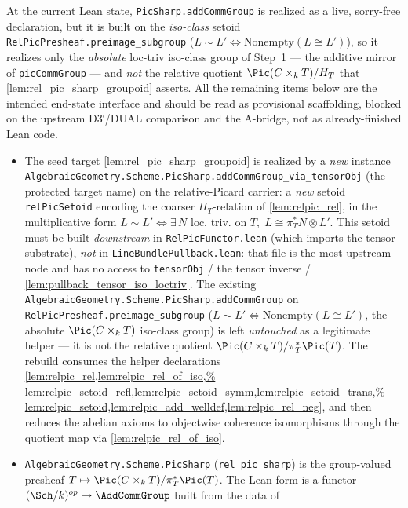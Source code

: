 At the current Lean state, \texttt{PicSharp.addCommGroup} is realized as a
live, sorry-free declaration, but it is built on the \emph{iso-class} setoid
\texttt{RelPicPresheaf.preimage\_subgroup}
(\(L \sim L' \iff \mathrm{Nonempty}(L \cong L')\)), so it realizes only the
\emph{absolute} loc-triv iso-class group of Step~1 --- the additive mirror of
\texttt{picCommGroup} --- and \emph{not} the relative quotient
\(\Pic(C \times_k T)/H_T\) that \cref{lem:rel_pic_sharp_groupoid} asserts. All
the remaining items below are the intended end-state interface and should be
read as provisional scaffolding, blocked on the upstream D3′/DUAL comparison
and the A-bridge, not as already-finished Lean code.
\begin{itemize}
  \item The seed target \cref{lem:rel_pic_sharp_groupoid} is realized by a
    \emph{new} instance
    \texttt{AlgebraicGeometry.Scheme.PicSharp.addCommGroup\_via\_tensorObj}
    (the protected target name) on the relative-Picard carrier: a \emph{new}
    setoid \texttt{relPicSetoid} encoding the coarser \(H_T\)-relation of
    \cref{lem:relpic_rel}, in the multiplicative form
    \(L \sim L' \iff \exists\, N\text{ loc.\ triv.\ on } T,\;
    L \cong \pi_T^* N \otimes L'\). This setoid must be built
    \emph{downstream} in \texttt{RelPicFunctor.lean} (which imports the tensor
    substrate), \emph{not} in \texttt{LineBundlePullback.lean}: that file is the
    most-upstream node and has no access to \texttt{tensorObj} / the tensor
    inverse / \cref{lem:pullback_tensor_iso_loctriv}. The existing
    \texttt{AlgebraicGeometry.Scheme.PicSharp.addCommGroup} on
    \texttt{RelPicPresheaf.preimage\_subgroup}
    (\(L \sim L' \iff \mathrm{Nonempty}(L \cong L')\), the absolute
    \(\Pic(C \times_k T)\) iso-class group) is left \emph{untouched} as a
    legitimate helper --- it is not the relative quotient
    \(\Pic(C \times_k T)/\pi_T^*\Pic(T)\). The rebuild consumes the helper
    declarations \cref{lem:relpic_rel,lem:relpic_rel_of_iso,%
lem:relpic_setoid_refl,lem:relpic_setoid_symm,lem:relpic_setoid_trans,%
lem:relpic_setoid,lem:relpic_add_welldef,lem:relpic_rel_neg}, and then
    reduces the abelian axioms to objectwise coherence isomorphisms through the
    quotient map via \cref{lem:relpic_rel_of_iso}.
  \item \texttt{AlgebraicGeometry.Scheme.PicSharp}
    (\texttt{rel\_pic\_sharp}) is the group-valued presheaf
    \(T \mapsto \Pic(C \times_k T)/\pi_T^*\Pic(T)\). The Lean form is a functor
    \((\Sch/k)^{op} \to \AddCommGroup\) built from the data of

\end{itemize}
